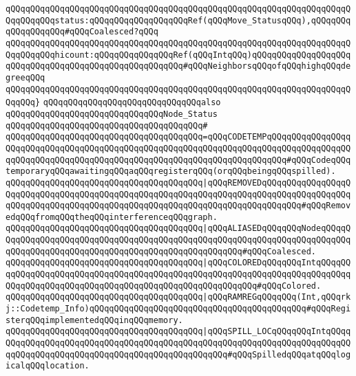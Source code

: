 \verb|qQQqqQQqqQQqqQQqqQQqqQQqqQQqqQQqqQQqqQQqqQQqqQQqqQQqqQQqqQQqqQQqqQQqqQQqqQQqqQQqstatus:qQQqqQQqqQQqqQQqqQQqRef(qQQqMove_StatusqQQq),qQQqqQQqqQQqqQQqqQQq#qQQqCoalesced?qQQq|\newline
\verb|qQQqqQQqqQQqqQQqqQQqqQQqqQQqqQQqqQQqqQQqqQQqqQQqqQQqqQQqqQQqqQQqqQQqqQQqqQQqqQQqhicount:qQQqqQQqqQQqqQQqRef(qQQqIntqQQq)qQQqqQQqqQQqqQQqqQQqqQQqqQQqqQQqqQQqqQQqqQQqqQQqqQQqqQQq#qQQqNeighborsqQQqofqQQqhighqQQqdegreeqQQq|\newline
\verb|qQQqqQQqqQQqqQQqqQQqqQQqqQQqqQQqqQQqqQQqqQQqqQQqqQQqqQQqqQQqqQQqqQQqqQQqqQQq}|\newline
\newline
\newline
\newline
\verb|qQQqqQQqqQQqqQQqqQQqqQQqqQQqqQQqalso|\newline
\verb|qQQqqQQqqQQqqQQqqQQqqQQqqQQqqQQqNode_Status|\newline
\verb|qQQqqQQqqQQqqQQqqQQqqQQqqQQqqQQqqQQqqQQq#|\newline
\verb|qQQqqQQqqQQqqQQqqQQqqQQqqQQqqQQqqQQqqQQq=qQQqCODETEMPqQQqqQQqqQQqqQQqqQQqqQQqqQQqqQQqqQQqqQQqqQQqqQQqqQQqqQQqqQQqqQQqqQQqqQQqqQQqqQQqqQQqqQQqqQQqqQQqqQQqqQQqqQQqqQQqqQQqqQQqqQQqqQQqqQQqqQQqqQQqqQQq#qQQqCodeqQQqtemporaryqQQqawaitingqQQqaqQQqregisterqQQq(orqQQqbeingqQQqspilled).|\newline
\verb|qQQqqQQqqQQqqQQqqQQqqQQqqQQqqQQqqQQqqQQq|\verb#|qQQqREMOVEDqQQqqQQqqQQqqQQqqQQqqQQqqQQqqQQqqQQqqQQqqQQqqQQqqQQqqQQqqQQqqQQqqQQqqQQqqQQqqQQqqQQqqQQqqQQqqQQqqQQqqQQqqQQqqQQqqQQqqQQqqQQqqQQqqQQqqQQqqQQqqQQqqQQq#\verb|#qQQqRemovedqQQqfromqQQqtheqQQqinterferenceqQQqgraph.|\newline
\verb|qQQqqQQqqQQqqQQqqQQqqQQqqQQqqQQqqQQqqQQq|\verb#|qQQqALIASEDqQQqqQQqNodeqQQqqQQqqQQqqQQqqQQqqQQqqQQqqQQqqQQqqQQqqQQqqQQqqQQqqQQqqQQqqQQqqQQqqQQqqQQqqQQqqQQqqQQqqQQqqQQqqQQqqQQqqQQqqQQqqQQqqQQqqQQq#\verb|#qQQqCoalesced.|\newline
\verb|qQQqqQQqqQQqqQQqqQQqqQQqqQQqqQQqqQQqqQQq|\verb#|qQQqCOLOREDqQQqqQQqIntqQQqqQQqqQQqqQQqqQQqqQQqqQQqqQQqqQQqqQQqqQQqqQQqqQQqqQQqqQQqqQQqqQQqqQQqqQQqqQQqqQQqqQQqqQQqqQQqqQQqqQQqqQQqqQQqqQQqqQQqqQQqqQQq#\verb|#qQQqColored.|\newline
\verb|qQQqqQQqqQQqqQQqqQQqqQQqqQQqqQQqqQQqqQQq|\verb#|qQQqRAMREGqQQqqQQq(Int,qQQqrkj::Codetemp_Info)qQQqqQQqqQQqqQQqqQQqqQQqqQQqqQQqqQQqqQQqqQQq#\verb|#qQQqRegisterqQQqimplementedqQQqinqQQqmemory.|\newline
\verb|qQQqqQQqqQQqqQQqqQQqqQQqqQQqqQQqqQQqqQQq|\verb#|qQQqSPILL_LOCqQQqqQQqIntqQQqqQQqqQQqqQQqqQQqqQQqqQQqqQQqqQQqqQQqqQQqqQQqqQQqqQQqqQQqqQQqqQQqqQQqqQQqqQQqqQQqqQQqqQQqqQQqqQQqqQQqqQQqqQQqqQQqqQQq#\verb|#qQQqSpilledqQQqatqQQqlogicalqQQqlocation.|\newline
